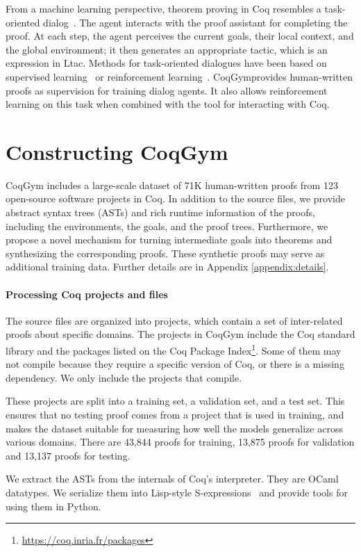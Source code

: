 \documentclass{article}
\newcommand{\smallsec}[1]{\vspace{-3mm} \paragraph{#1}}
\newcommand{\datasetname}{CoqGym}
\newcommand{\numberofprojects}{123 }
\newcommand{\numberoftrainproofs}{43,844 }
\newcommand{\numberofvalidproofs}{13,875 }
\newcommand{\numberoftestproofs}{13,137 }
\begin{document}
From a machine learning perspective, theorem proving in Coq resembles a task-oriented dialog~\citep{bordes2016learning}.
The agent interacts with the proof assistant for completing the proof.
At each step, the agent perceives the current goals, their local context, and the global environment;
it then generates an appropriate tactic, which is an expression in Ltac.
Methods for task-oriented dialogues have been based on supervised learning~\citep{bordes2016learning} or reinforcement learning~\citep{liu2017end}.
\datasetname provides human-written proofs as supervision for training dialog agents.
It also allows reinforcement learning on this task when combined with the tool for interacting with Coq.



\section{Constructing \datasetname}


{\datasetname } includes a large-scale dataset of 71K human-written proofs from \numberofprojects open-source software projects in Coq. 
In addition to the source files, we provide abstract syntax trees (ASTs) and rich runtime information of the proofs, including the environments, the goals, and the proof trees.
Furthermore, we propose a novel mechanism for turning intermediate goals into theorems and synthesizing the corresponding proofs.
These synthetic proofs may serve as additional training data.
Further details are in Appendix \ref{appendix:details}.


\smallsec{Processing Coq projects and files}
The source files are organized into projects, which contain a set of inter-related proofs about specific domains. 
The projects in {\datasetname } include the Coq standard library and the packages listed on the Coq Package Index\footnote{\url{https://coq.inria.fr/packages}}.
Some of them may not compile because they require a specific version of Coq, or there is a missing dependency.
We only include the projects that compile.


These projects are split into a training set, a validation set, and a test set.
This ensures that no testing proof comes from a project that is used in training, and makes the dataset suitable for measuring how well the models generalize across various domains.
There are \numberoftrainproofs proofs for training, \numberofvalidproofs proofs for validation and \numberoftestproofs proofs for testing.

We extract the ASTs from the internals of Coq's interpreter.
They are OCaml datatypes.
We serialize them into Lisp-style S-expressions~\citep{mccarthy1960recursive} and provide tools for using them in Python.
\end{document}
